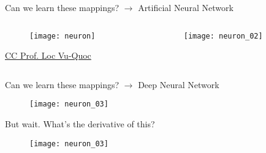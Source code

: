 \begin{frame}{Can we learn these mappings? $\rightarrow$ Artificial Neural Network}

  \begin{columns}
    \begin{column}{0.48\textwidth}
      \begin{figure}
        \texttt{[image: neuron]}

      \end{figure}
      \tiny{\href{https://en.wikipedia.org/wiki/Artificial_neuron\#/media/File:Neuron3.svg}{CC Prof. Loc Vu-Quoc}}
    \end{column}
    \begin{column}{0.48\textwidth}
      \begin{figure}
        \texttt{[image: neuron\_02]}
      \end{figure}
    \end{column}
  \end{columns}
\end{frame}


\begin{frame}{Can we learn these mappings? $\rightarrow$ Deep Neural Network}
  \begin{figure}
    \texttt{[image: neuron\_03]}
  \end{figure}
\end{frame}


\begin{frame}{But wait. What's the derivative of this?}
  \begin{figure}
    \texttt{[image: neuron\_03]}
  \end{figure}
\end{frame}


